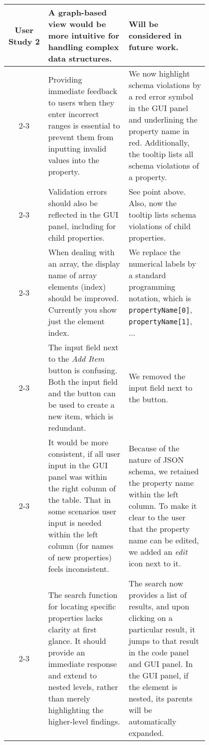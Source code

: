 \begin{table*}

    \centering
    \small %
    \setlength{\extrarowheight}{5pt} %
    \renewcommand{\arraystretch}{1.5} %
    \begin{tabular}{|c|p{0.4\linewidth}|p{0.4\linewidth}|}
        \hline
        User Study 2 & A graph-based view would be more intuitive for handling complex data structures. & 
        Will be considered in future work. \\
        \cline{2-3}
        & Providing immediate feedback to users when they enter incorrect ranges is essential to prevent them from inputting invalid values into the property. & 
        We now highlight schema violations by a red error symbol in the GUI panel and underlining the property name in red. 
        Additionally, the tooltip lists all schema violations of a property. \\
        \cline{2-3}
        & Validation errors should also be reflected in the GUI panel, including for child properties. & 
        See point above. 
        Also, now the tooltip lists schema violations of child properties. \\
        \cline{2-3}
        & When dealing with an array, the display name of array elements (index) should be improved.
        Currently you show just the element index. & 
        We replace the numerical labels by a standard programming notation, which is \texttt{propertyName[0]}, \texttt{propertyName[1]}, ...
        \\
        \cline{2-3}
        & The input field next to the \textit{Add Item} button is confusing. Both the input field and the button can be used to create a new item, which is redundant.
        & We removed the input field next to the button. \\
        \cline{2-3}
        & It would be more consistent, if all user input in the GUI panel was within the right column of the table. 
        That in some scenarios user input is needed within the left column (for names of new properties) feels inconsistent.
         & Because of the nature of JSON schema, we retained the property name within the left column. 
         To make it clear to the user that the property name can be edited, we added an \textit{edit} icon next to it. \\
        \cline{2-3}
        & The search function for locating specific properties lacks clarity at first glance. 
        It should provide an immediate response and extend to nested levels, rather than merely highlighting the higher-level findings. & 
        The search now provides a list of results, and upon clicking on a particular result, it jumps to that result in the code panel and GUI panel. In the GUI panel, if the element is nested, its parents will be automatically expanded. \\
        \hline
    \end{tabular}
    \caption*{User Study Feedback and Resolution (Continued)} \label{tab:user_study2}

\end{table*}

